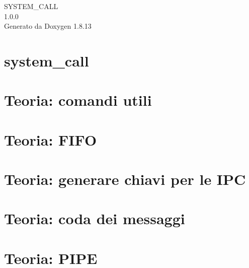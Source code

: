 \documentclass[twoside]{book}
\newcommand{\+}{\discretionary{\mbox{\scriptsize$\hookleftarrow$}}{}{}}
\newcommand{\clearemptydoublepage}{%
  \newpage{\pagestyle{empty}\cleardoublepage}%
}
\begin{document}
\hypersetup{pageanchor=false,
             bookmarksnumbered=true,
             pdfencoding=unicode
            }
\begin{titlepage}
\vspace*{7cm}
\begin{center}%
{\Large S\+Y\+S\+T\+E\+M\+\_\+\+C\+A\+LL \\[1ex]\large 1.\+0.\+0 }\\
\vspace*{1cm}
{\large Generato da Doxygen 1.8.13}\\
\end{center}
\end{titlepage}
\clearemptydoublepage
{}
\tableofcontents
\clearemptydoublepage
{}
\hypersetup{pageanchor=true}

\chapter{system\+\_\+call}
\label{index}\hypertarget{index}{}
\chapter{Teoria\+: comandi utili}
\label{md_theory_commands_commands}

\chapter{Teoria\+: F\+I\+FO}
\label{md_theory_fifo_fifo}

\chapter{Teoria\+: generare chiavi per le I\+PC}
\label{md_theory_generate_keys_generate_keys}

\chapter{Teoria\+: coda dei messaggi}
\label{md_theory_message_queue_message_queue}

\chapter{Teoria\+: P\+I\+PE}
\label{md_theory_pipe_pipe}

\end{document}
